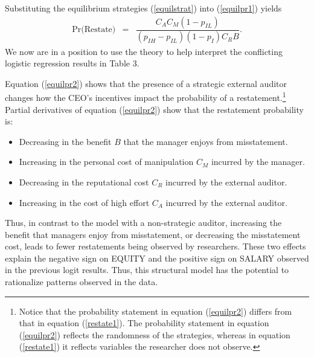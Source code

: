 Substituting the equilibrium strategies (\ref{equilstrat}) into (\ref{equilpr1}) yields
\begin{equation} \label{equilpr2}
\begin{array}{lcl}
\mbox{Pr(Restate)}& = &  \dfrac{C_AC_M(1-p_{IL})}{(p_{IH}-p_{IL})(1-p_I)C_RB}.
\end{array}\end{equation}
We now are in a position to use the theory to help interpret the conflicting logistic regression results
in Table 3. 

Equation (\ref{equilpr2}) shows that the presence of a strategic external auditor
changes how the CEO's incentives impact the probability of a restatement.\footnote{Notice that
the probability statement in equation  (\ref{equilpr2})  differs from that in equation (\ref{restate1}).
The probability statement in equation  (\ref{equilpr2}) reflects the randomness of the strategies, whereas in equation (\ref{restate1}) it reflects variables the researcher does not observe.} 
Partial derivatives of equation (\ref{equilpr2}) show that the restatement probability is:
\begin{itemize}
\item Decreasing in the benefit $B$ that the manager enjoys from misstatement.
\item Increasing in the personal cost of manipulation $C_M$ incurred by the manager.
\item Decreasing in the reputational cost $C_R$ incurred by the external auditor.
\item Increasing in the cost of high effort $C_A$ incurred by the external auditor.
\end{itemize}

Thus, in contrast to the model with a non-strategic auditor, increasing the benefit that managers enjoy from misstatement, or decreasing the misstatement cost, leads to fewer restatements being observed by researchers.
These two effects explain the negative sign on EQUITY and the positive sign on SALARY observed in the previous logit results. Thus, this structural model has the potential to rationalize patterns observed in the data.

